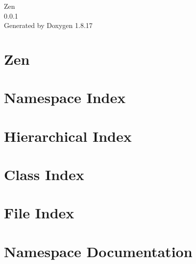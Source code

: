 \let\mypdfximage\pdfximage\def\pdfximage{\immediate\mypdfximage}\documentclass[twoside]{book}
\newcommand{\+}{\discretionary{\mbox{\scriptsize$\hookleftarrow$}}{}{}}
\newcommand{\clearemptydoublepage}{%
  \newpage{\pagestyle{empty}\cleardoublepage}%
}
\begin{document}
\hypersetup{pageanchor=false,
             bookmarksnumbered=true,
             pdfencoding=unicode
            }
\begin{titlepage}
\vspace*{7cm}
\begin{center}%
{\Large Zen \\[1ex]\large 0.\+0.\+1 }\\
\vspace*{1cm}
{\large Generated by Doxygen 1.8.17}\\
\end{center}
\end{titlepage}
\clearemptydoublepage
{}
\tableofcontents
\clearemptydoublepage
{}
\hypersetup{pageanchor=true}

\chapter{Zen}
\label{index}\hypertarget{index}{}
\chapter{Namespace Index}

\chapter{Hierarchical Index}

\chapter{Class Index}

\chapter{File Index}

\chapter{Namespace Documentation}




\end{document}
